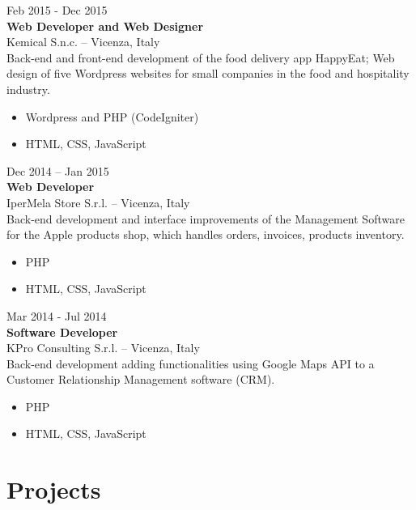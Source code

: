 \documentclass[]{friggeri-cv}
\begin{document}
{Feb 2015 - Dec 2015} \\
{\textbf{Web Developer and Web Designer}} \\
{Kemical S.n.c.} -- {Vicenza, Italy} \\
{Back-end and front-end development of the food delivery app HappyEat; 
Web design of five Wordpress websites for small companies in the food and hospitality industry.}
\begin{itemize}[noitemsep]
\item Wordpress and PHP (CodeIgniter)
\item HTML, CSS, JavaScript \newline
\end{itemize}

{Dec 2014 -- Jan 2015} \\
{\textbf{Web Developer}} \\
{IperMela Store S.r.l.} -- {Vicenza, Italy} \\
{Back-end development and interface improvements of the Management Software for the Apple products shop, which handles orders, invoices, products inventory.}
\begin{itemize}[noitemsep]
\item PHP
\item HTML, CSS, JavaScript \newline
\end{itemize}

{Mar 2014 - Jul 2014} \\
{\textbf{Software Developer}} \\
{KPro Consulting S.r.l.} -- {Vicenza, Italy} \\
{Back-end development adding functionalities using Google Maps API to a Customer Relationship Management software (CRM).}
\begin{itemize}[noitemsep]
\item PHP
\item HTML, CSS, JavaScript \newline
\end{itemize}


\section{Projects}
\end{document}

